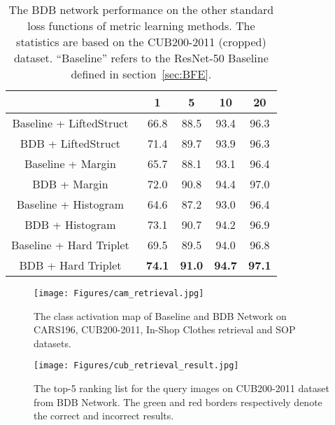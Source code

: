 \documentclass[10pt,twocolumn,letterpaper]{article}
\begin{document}
\begin{table}
    \begin{center}
        \resizebox{0.9\linewidth}{!}
        {
            \begin{tabular}{c|c|c|c|c}
             \hline
              & 1 & 5 & 10 & 20 \\
             \hline\hline
             Baseline + LiftedStruct~\cite{oh2016deep} & 66.8 & 88.5 & 93.4 & 96.3 \\
             BDB + LiftedStruct~\cite{oh2016deep} & 71.4 & 89.7 & 93.9 & 96.3  \\
             \hline\hline
             Baseline + Margin~\cite{wu2017sampling} & 65.7 & 88.1 & 93.1 & 96.4   \\
             BDB + Margin~\cite{wu2017sampling} & 72.0 & 90.8 & 94.4 & 97.0   \\
             \hline\hline
             Baseline + Histogram~\cite{ustinova2016histogram} & 64.6 & 87.2 & 93.0 & 96.4   \\
             BDB + Histogram~\cite{ustinova2016histogram} & 73.1 & 90.7 & 94.2 & 96.9   \\
             \hline\hline
             Baseline + Hard Triplet~\cite{hermans2017defense} & 69.5 & 89.5 & 94.0 & 96.8 \\
             BDB + Hard Triplet~\cite{hermans2017defense} & {\bf 74.1} & {\bf 91.0} & {\bf 94.7} & {\bf 97.1} \\
             \hline
            \end{tabular}
        }
    \end{center}\vspace{-4mm}
    \caption{The BDB network performance on the other standard loss functions of metric learning methods. The statistics are based on the CUB200-2011 (cropped) dataset. ``Baseline'' refers to the ResNet-50 Baseline defined in section~\ref{sec:BFE}.}
    \vspace{2mm}
    \label{tab:compare_loss}
\end{table}

\begin{figure}
\texttt{[image: Figures/cam\_retrieval.jpg]}
\caption{The class activation map of Baseline and BDB Network on CARS196, CUB200-2011, In-Shop Clothes retrieval and SOP datasets.}
\label{fig:cub_attention}
\vspace{3mm}
\end{figure}

\begin{figure}
\vspace{-3mm}
\texttt{[image: Figures/cub\_retrieval\_result.jpg]}
\vspace{-3mm}
\caption{The top-5 ranking list for the query images on CUB200-2011 dataset from BDB Network. The green and red borders respectively denote the correct and incorrect results.}
\label{fig:cub_retrieval_result}
\vspace{2mm}
\end{figure}
\end{document}
